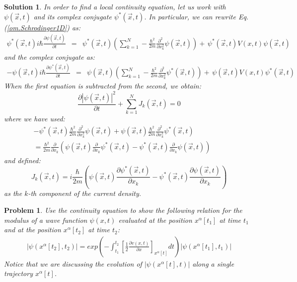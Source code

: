 \documentclass[nofootinbib, secnumarabic, amsmath, nobibnotes,10pt,aps,pra]{revtex4-1}
\newtheorem{problem}{Problem}
\newtheorem{solution}{Solution}
\newcommand{\eref}[1]{Eq. (\ref{#1})}
\begin{document}
\begin{solution}

In order to find a local continuity equation, let us work with $\psi(\vec{x},t)$ and its complex conjugate $\psi^*(\vec x,t)$. In particular, we can rewrite \eref{om.Schrodinger1D} as:
\begin{eqnarray}
\psi^*(\vec x,t) i \hbar \frac{\partial \psi(\vec x,t)} {\partial t}
&=& \psi^*(\vec x,t)\left( \sum_{k = 1}^N -\frac{\hbar^2}{2m}\frac
{\partial^2} {\partial x_k^2} \psi(\vec x,t)\right) +\, \psi^*(\vec x,t) V(x,t) \psi(\vec x,t)\nonumber
\end{eqnarray}
and the complex conjugate as:
\begin{eqnarray}
-\psi(\vec x,t)i \hbar \frac{\partial \psi^*(\vec x,t)} {\partial t} &=& \psi(\vec x,t)\left( \sum_{k = 1}^N - \frac{\hbar^2}{2m}\frac {\partial^2} {\partial x_k^2} \psi^*(\vec x,t) \right)+\, \psi(\vec x,t)V(x,t) \psi^*(\vec x,t)\nonumber
\end{eqnarray}
When the first equation is subtracted from the second, we obtain:
\begin{equation}
\frac{\partial |\psi(\vec{x},t)|^2} {\partial t} + \sum_{k = 1}^{N} J_k(\vec{x},t) = 0\nonumber
\end{equation}
where we have used:
\begin{eqnarray}
- \psi^*(\vec x,t)\frac{\hbar^2}{2m}\frac {\partial^2} {\partial x_k^2} \psi(\vec x,t) + \psi(\vec x,t)\frac{\hbar^2}{2m}\frac {\partial^2} {\partial x_k^2} \psi^*(\vec x,t) \nonumber\\= \frac{\hbar^2}{2m} \frac {\partial} {\partial x_k} \left( \psi(\vec x,t)\frac {\partial} {\partial x_k} \psi^*(\vec x,t)-\psi^*(\vec x,t)\frac {\partial} {\partial x_k} \psi(\vec x,t) \right)\qquad\nonumber
\end{eqnarray}
and defined:
\begin{equation}
J_k(\vec{x},t) = i \frac {\hbar} {2 m} \left( \psi(\vec{x},t) \frac {\partial \psi^{*}(\vec{x},t)} {\partial x_k}- \psi^{*}(\vec{x},t) \frac {\partial \psi(\vec{x},t)} {\partial x_k} \right)\nonumber
\end{equation}
as the $k$-th component of the current density.
\end{solution}

\begin{problem} \label{om.P9}
Use the continuity equation to show the following relation for the modulus of a wave function $\psi(x,t)$ evaluated at the position $x^{\alpha}[t_1]$ at time $t_1$ and at the position $x^{\alpha}[t_2]$ at time $t_2$:
\begin{eqnarray}
|\psi(x^{\alpha}[t_2],t_2)|=exp\left(-\int_{t_1}^{t_2}\left[\frac{1}{2}\frac{\partial v(x,t)}{\partial x}\right]_{x^{\alpha}[t]}dt \right) |\psi(x^{\alpha}[t_1],t_1)|\nonumber
\end{eqnarray}
Notice that we are discussing the evolution of $|\psi(x^{\alpha}[t],t)|$ along a single trajectory  $x^{\alpha}[t]$.
\end{problem}
\end{document}
